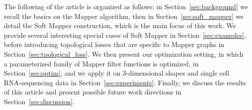 The following of the article is organized as follows: in Section~\ref{sec:background} we recall the basics on the Mapper algorithm, then in Section~\ref{sec:soft_mapper} we detail the Soft Mapper construction, which is the main  focus of this work. We provide several interesting special cases of Soft Mapper in Section~\ref{sec:examples}, before introducing topological losses that are specific to Mapper graphs in Section~\ref{sec:tpological_loss}. We then present our optimization setting, in which a parameterized family of Mapper filter functions is optimized, in Section~\ref{sec:optim}, and we 
apply it on
3-dimensional shapes and single cell RNA-sequencing data in Section~\ref{sec:experiments}. Finally, we discuss the results of this article and present possible future work directions in Section~\ref{sec:discussion}.

